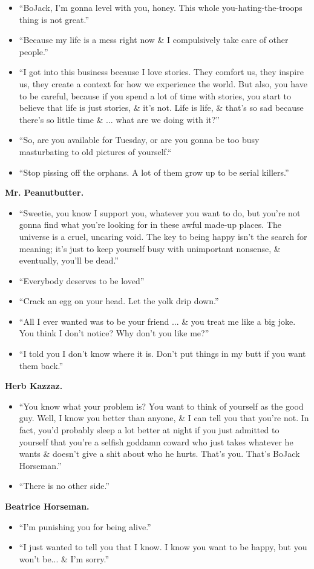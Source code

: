 \documentclass{article}
\begin{document}
\begin{enumerate}
\begin{itemize}
    	\item ``BoJack, I'm gonna level with you, honey. This whole you-hating-the-troops thing is not great.''
    	\item ``Because my life is a mess right now \& I compulsively take care of other people.''
    	\item ``I got into this business because I love stories. They comfort us, they inspire us, they create a context for how we experience the world. But also, you have to be careful, because if you spend a lot of time with stories, you start to believe that life is just stories, \& it's not. Life is life, \& that's so sad because there's so little time \& ... what are we doing with it?''
    	\item ``So, are you available for Tuesday, or are you gonna be too busy masturbating to old pictures of yourself.``
    	\item ``Stop pissing off the orphans. A lot of them grow up to be serial killers.''
    \end{itemize}
    {\bf Mr. Peanutbutter.}
    \begin{itemize}
    	\item ``Sweetie, you know I support you, whatever you want to do, but you're not gonna find what you're looking for in these awful made-up places. The universe is a cruel, uncaring void. The key to being happy isn't the search for meaning; it's just to keep yourself busy with unimportant nonsense, \& eventually, you'll be dead.''
    	\item ``Everybody deserves to be loved''
    	\item ``Crack an egg on your head. Let the yolk drip down.''
    	\item ``All I ever wanted was to be your friend ... \& you treat me like a big joke. You think I don't notice? Why don't you like me?''
    	\item ``I told you I don't know where it is. Don't put things in my butt if you want them back.''
    \end{itemize}
    {\bf Herb Kazzaz.}
    \begin{itemize}
    	\item ``You know what your problem is? You want to think of yourself as the good guy. Well, I know you better than anyone, \& I can tell you that you're not. In fact, you'd probably sleep a lot better at night if you just admitted to yourself that you're a selfish goddamn coward who just takes whatever he wants \& doesn't give a shit about who he hurts. That's you. That's BoJack Horseman.''
    	\item ``There is no other side.''
    \end{itemize}
    {\bf Beatrice Horseman.}
    \begin{itemize}
    	\item ``I'm punishing you for being alive.''
    	\item ``I just wanted to tell you that I know. I know you want to be happy, but you won't be... \& I'm sorry.''
    	

\end{itemize}
\end{enumerate}
\end{document}
